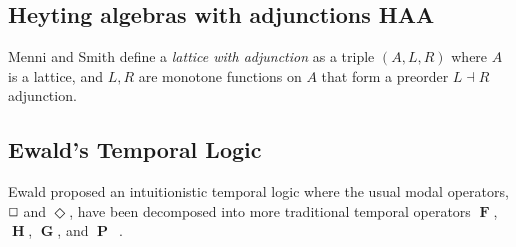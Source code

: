 \documentclass{article}
\renewcommand{\Box}{\oblong}
\newcommand{\F}{\mathop{\textbf{F}}}
\renewcommand{\P}{\mathop{\textbf{P}}}
\newcommand{\G}{\mathop{\textbf{G}}}
\renewcommand{\H}{\mathop{\textbf{H}}}
\begin{document}

\subsection{Heyting algebras with adjunctions HAA}
Menni and Smith \cite{Menni:2014} define a \textit{lattice with adjunction} as a triple $(A, L, R)$ where $A$ is a lattice, and $L, R$   are  monotone functions on $A$ that form a preorder $L\dashv R$ adjunction.


\subsection{Ewald's Temporal Logic}

Ewald proposed an intuitionistic temporal logic where the usual modal operators, $\Box$ and $\Diamond$, have been decomposed into more
traditional temporal operators  $\F$, $\H$, $\G$, and $\P$~\cite{ewald1986}.  
\end{document}
